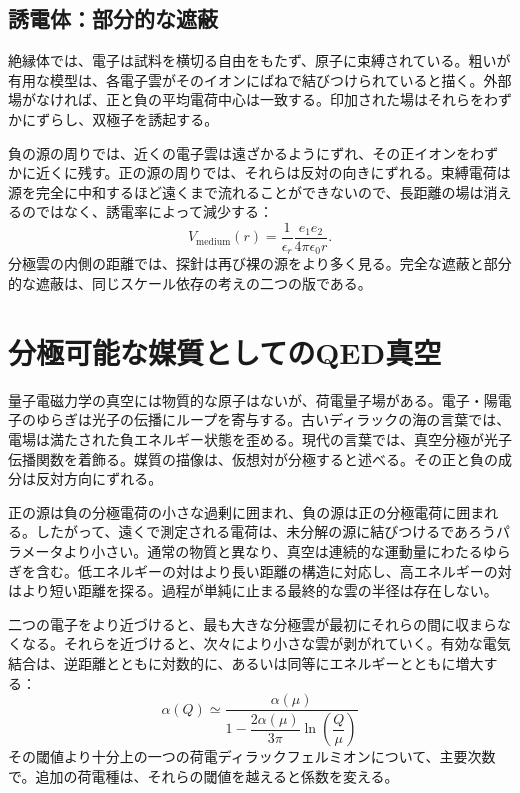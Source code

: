 \subsection{誘電体：部分的な遮蔽}

絶縁体では、電子は試料を横切る自由をもたず、原子に束縛されている。粗いが有用な模型は、各電子雲がそのイオンにばねで結びつけられていると描く。外部場がなければ、正と負の平均電荷中心は一致する。印加された場はそれらをわずかにずらし、双極子を誘起する。

負の源の周りでは、近くの電子雲は遠ざかるようにずれ、その正イオンをわずかに近くに残す。正の源の周りでは、それらは反対の向きにずれる。束縛電荷は源を完全に中和するほど遠くまで流れることができないので、長距離の場は消えるのではなく、誘電率によって減少する：
\begin{equation}
  V_{\mathrm{medium}}(r)
  =
  \frac{1}{\epsilon_r}
  \frac{e_1e_2}{4\pi\epsilon_0r}.
  \label{eq:l10-dielectric-coulomb}
\end{equation}
分極雲の内側の距離では、探針は再び裸の源をより多く見る。完全な遮蔽と部分的な遮蔽は、同じスケール依存の考えの二つの版である。

\section{分極可能な媒質としてのQED真空}

量子電磁力学の真空には物質的な原子はないが、荷電量子場がある。電子・陽電子のゆらぎは光子の伝播にループを寄与する。古いディラックの海の言葉では、電場は満たされた負エネルギー状態を歪める。現代の言葉では、真空分極が光子伝播関数を着飾る。媒質の描像は、仮想対が分極すると述べる。その正と負の成分は反対方向にずれる。

正の源は負の分極電荷の小さな過剰に囲まれ、負の源は正の分極電荷に囲まれる。したがって、遠くで測定される電荷は、未分解の源に結びつけるであろうパラメータより小さい。通常の物質と異なり、真空は連続的な運動量にわたるゆらぎを含む。低エネルギーの対はより長い距離の構造に対応し、高エネルギーの対はより短い距離を探る。過程が単純に止まる最終的な雲の半径は存在しない。

二つの電子をより近づけると、最も大きな分極雲が最初にそれらの間に収まらなくなる。それらを近づけると、次々により小さな雲が剥がれていく。有効な電気結合は、逆距離とともに対数的に、あるいは同等にエネルギーとともに増大する：
\begin{equation}
  \alpha(Q)
  \simeq
  \frac{\alpha(\mu)}
  {1-\dfrac{2\alpha(\mu)}{3\pi}
  \ln\!\left(\dfrac{Q}{\mu}\right)}
  \label{eq:l10-qed-running}
\end{equation}
その閾値より十分上の一つの荷電ディラックフェルミオンについて、主要次数で。追加の荷電種は、それらの閾値を越えると係数を変える。

